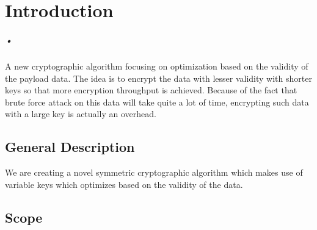 

\chapter{Introduction}
\label{report}
\paragraph*{•}

\hspace{8mm} 

A new cryptographic algorithm focusing on optimization based on the validity of the payload data. The idea is to encrypt the data with lesser validity with shorter keys so that more encryption throughput is achieved. Because of the fact that brute force attack on this data will take quite a lot of time, encrypting such data with a large key is actually an overhead.



  
  


\section{General Description}

\hspace{8mm} We are creating a novel symmetric cryptographic algorithm which makes use of variable keys which optimizes based on the validity of the data. 

\section{Scope}

